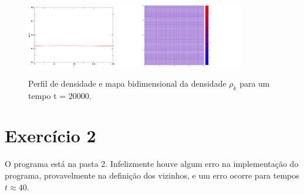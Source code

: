 \documentclass[a4wide]{report}
\begin{document}
\begin{figure}[!htb]
\centering
\includegraphics[width=0.35\textwidth]{perfil20000.pdf}
\includegraphics[width=0.5\textwidth]{mapa20000.pdf}
\caption{Perfil de densidade e mapa bidimensional da densidade $\rho_k$ para um tempo t = 20000.}
\label{1d}
\end{figure}


\section*{Exercício 2}
O programa está na pasta 2. Infelizmente houve algum erro na implementação do programa, provavelmente na definição dos vizinhos, e um erro ocorre para tempos $t \approx 40$.
\end{document}
